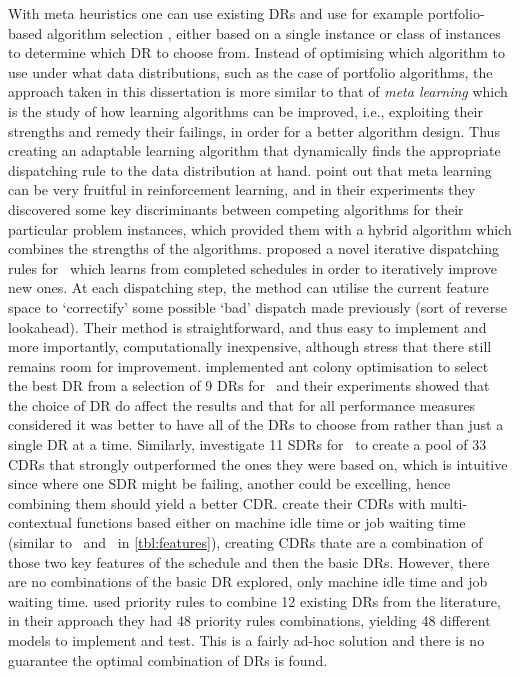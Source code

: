 With meta heuristics one can use existing DRs and use for example 
{portfolio-based algorithm selection} \citep{Rice76,Gomes01}, either based 
on a single instance or class of instances \citep{Xu07} to determine which DR 
to choose from. 
Instead of optimising which algorithm to use under what data distributions, 
such as the case of portfolio algorithms, the approach taken in this 
dissertation is more similar to that of \emph{meta learning} \citep{Vilalta02} 
which is the study of how learning algorithms can be improved, i.e., exploiting 
their strengths and remedy their failings, in order for a better algorithm 
design. Thus creating an adaptable learning algorithm that dynamically finds 
the appropriate dispatching rule  to the data distribution at hand. 
\citet{Kalyanakrishnan11} point out that meta learning can be very fruitful in 
reinforcement learning, and in their experiments they discovered some key 
discriminants between competing algorithms for their particular problem 
instances, which provided them with a hybrid algorithm which combines the 
strengths of the algorithms.
\citet{Nguyen13} proposed a novel {iterative dispatching rules} for \JSP\ 
which learns from completed schedules in order to iteratively improve new ones. 
At each dispatching step, the method can utilise the current feature space to 
`correctify' some possible `bad' dispatch made previously (sort of reverse 
lookahead). Their method is straightforward, and thus easy to implement and 
more importantly, computationally inexpensive, although \citeauthor{Nguyen13} 
stress that there still remains room for improvement. 
\citet{Korytkowski13} implemented {ant colony optimisation} to select the 
best DR from a selection of 9 DRs for \JSP\ and their experiments showed 
that the choice of DR do affect the results and that for all performance 
measures considered it was better to have all of the DRs to choose from rather 
than just a single DR at a time. 
Similarly, \citet{Lu13} investigate 11 SDRs for \JSP\ to create a pool of 
33 CDRs that strongly outperformed the ones they were based on, which 
is intuitive since where one SDR might be failing, another could be excelling, 
hence combining them should yield a better CDR. \citeauthor{Lu13} create their 
CDRs with {multi-contextual functions} based either on machine idle time 
or job waiting time (similar to \phiwait\ and \phimacSlack\ in 
\cref{tbl:features}), creating CDRs thate are a combination of those 
two key features of the schedule and then the basic DRs. However, there are no 
combinations of the basic DR explored, only machine idle time and job waiting 
time.  
\citet{Yu13} used priority rules to combine 12 existing DRs from the 
literature, in their approach they had 48 priority rules combinations, 
yielding 48 different models to implement and test. This is a fairly 
ad-hoc solution and there is no guarantee the optimal combination of DRs is 
found. 

